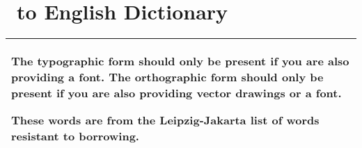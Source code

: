 
\chapter{\LanguageName\ to English Dictionary}

\newcommand{\entryHeading}[1]{
\begin{center}
\setcounter{secnumdepth}{0}
\Huge
\hypertarget{MYL#1}{\section{#1}}

\Large
{\ }

\normalsize
\begin{tabular}{*{14}{|c}|}\hline
&&&&&&&&&&&&&\\
\hyperlink{MYLA}{\Large A}&
\hyperlink{MYLB}{\Large B}&
\hyperlink{MYLCH}{\Large CH}&
\hyperlink{MYLD}{\Large D}&
\hyperlink{MYLDZ}{\Large DZ}&
\hyperlink{MYLE}{\Large E}&
\hyperlink{MYLF}{\Large F}&
\hyperlink{MYLG}{\Large G}&
\hyperlink{MYLH}{\Large H}&
\hyperlink{MYLI}{\Large I}&
\hyperlink{MYLJ}{\Large J}&
\hyperlink{MYLK}{\Large K}&
\hyperlink{MYLKH}{\Large KH}&
\hyperlink{MYLL}{\Large L}\\
&&&&&&&&&&&&&\\\hline&&&&&&&&&&&&&\\
\hyperlink{MYLM}{\Large M}&
\hyperlink{MYLN}{\Large N}&
\hyperlink{MYLO}{\Large O}&
\hyperlink{MYLP}{\Large P}&
\hyperlink{MYLR}{\Large R}&
\hyperlink{MYLS}{\Large S}&
\hyperlink{MYLSH}{\Large SH}&
\hyperlink{MYLT}{\Large T}&
\hyperlink{MYLTS}{\Large TS}&
\hyperlink{MYLU}{\Large U}&
\hyperlink{MYLV}{\Large V}&
\hyperlink{MYLY}{\Large Y}&
\hyperlink{MYLZ}{\Large Z}&
\hyperlink{MYLZH}{\Large ZH}\\
&&&&&&&&&&&&&\\\hline
\end{tabular}
\end{center}
}

\begin{center}
\begin{tabular}{|p{}|}\hline
The typographic form should only be present if you are also providing a font.
The orthographic form should only be present if you are also providing vector drawings or a font.

These words are from the Leipzig-Jakarta list of words resistant to borrowing.
\\\hline
\end{tabular}
\end{center}


